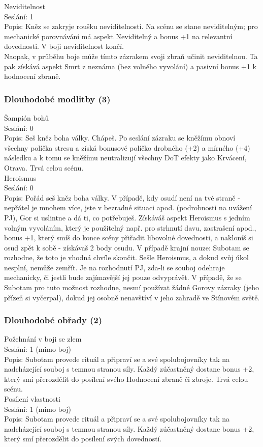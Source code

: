 \documentclass[../../main.tex]{subfiles}
\begin{document}
Neviditelnost\\
Seslání: 1\\
Popis: Kněz se zakryje roušku neviditelnosti. Na scénu se stane neviditelným; pro mechanické porovnávání má aspekt Neviditelný a bonus +1 na relevantní dovednosti. V boji neviditelnost končí. \\
Naopak, v průběhu boje může tímto zázrakem svoji zbraň učinit neviditelnou. Ta pak získává aspekt Smrt z neznáma (bez volného vyvolání) a pasivní bonus +1 k hodnocení zbraně.\\


\subsubsection{Dlouhodobé modlitby (3)}


Šampión bohů\\
Seslání: 0\\
Popis: Seš kněz boha války. Chápeš. Po seslání zázraku se kněžímu obnoví všechny políčka stresu a získá bonusové políčko drobného (+2) a mírného (+4) následku a k tomu se kněžímu neutralizují všechny DoT efekty jako Krvácení, Otrava. Trvá celou scénu.\\

Heroismus\\
Seslání: 0\\
Popis: Pořád seš kněz boha války. V případě, kdy osudí není na tvé straně - nepřátel je mnohem více, jste v bezradné situaci apod. (podrobnosti na uvážení PJ), Gor si uslintne a dá ti, co potřebuješ.  Získáváš aspekt Heroismus s jedním volným vyvoláním, který je použitelný např. pro strhnutí davu, zastrašení apod., bonus +1, který smíš do konce scény přiřadit libovolné dovednosti, a nakloníš si osud zpět k sobě - získávaš 2 body osudu. 
	V případě krajní nouze: Subotam se rozhodne, že toto je vhodná chvíle skončit. Sešle Heroismus, a dokud svůj úkol nesplní, nemůže zemřít. Je na rozhodnutí PJ, zda-li se souboj odehraje mechanicky, či jestli bude zajímavější jej pouze odvyprávět. V případě, že se Subotam pro tuto možnost rozhodne, nesmí používat žádné Gorovy zázraky (jeho přízeň si vyčerpal), dokud jej osobně nenavštíví v jeho zahradě ve Stínovém světě.\\

\subsubsection{Dlouhodobé obřady (2)}


Požehnání v boji se zlem\\
Seslání: 1 (mimo boj)\\
Popis: Subotam provede rituál a připraví se a své spolubojovníky tak na nadcházející souboj s temnou stranou síly.  Každý zúčastněný dostane bonus +2, který smí přerozdělit do posílení svého Hodnocení zbraně či zbroje. Trvá celou scénu. \\


Posílení vlastnosti\\
Seslání: 1 (mimo boj)\\
Popis: Subotam provede rituál a připraví se a své spolubojovníky tak na nadcházející souboj s temnou stranou síly. Každý zúčastněný dostane bonus +2, který smí přerozdělit do posílení svých dovedností. \\
\end{document}
